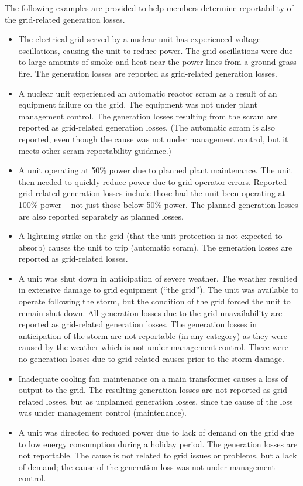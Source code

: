 The following examples are provided to help members determine
reportability of the grid-related generation losses.
\begin{itemize}
\item The electrical grid served by a nuclear unit has experienced voltage oscillations, causing the unit to reduce power. The grid oscillations were due to large amounts of smoke and heat near the power lines from a ground grass fire. The generation losses are reported as grid-related generation losses.
\item  A nuclear unit experienced an automatic reactor scram as a result of an equipment failure on the grid. The equipment was not under plant management control. The generation losses resulting from the scram are reported as grid-related generation losses. (The automatic scram is also reported, even though the cause was not under management control, but it meets other scram reportability guidance.)
\item  A unit operating at 50\% power due to planned plant maintenance. The unit then needed to quickly reduce power due to grid operator errors. Reported grid-related generation losses include those had the unit been operating at 100\% power – not just those below 50\% power. The planned generation losses are also reported separately as planned losses.
\item  A lightning strike on the grid (that the unit protection is not expected to absorb) causes the unit to trip (automatic scram). The generation losses are reported as grid-related losses.
\item  A unit was shut down in anticipation of severe weather. The weather resulted in extensive damage to grid equipment (“the grid”). The unit was available to operate following the storm, but the condition of the grid forced the unit to remain shut down. All generation losses due to the grid unavailability are reported as grid-related generation losses. The generation losses in anticipation of the storm are not reportable (in any category) as they were caused by the weather which is not under management control. There were no generation losses due to grid-related causes prior to the storm damage.
\item  Inadequate cooling fan maintenance on a main transformer causes a loss of output to the grid. The resulting generation losses are not reported as grid-related losses, but as unplanned generation losses, since the cause of the loss was under management control (maintenance).
\item  A unit was directed to reduced power due to lack of demand on
  the grid due to low energy consumption during a holiday period. The
  generation losses are not reportable. The cause is not related to
  grid issues or problems, but a lack of demand; the cause of the
  generation loss was not under management control.
\end{itemize}

